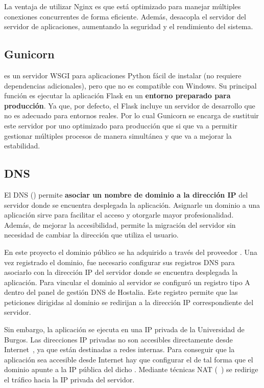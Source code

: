 La ventaja de utilizar Nginx es que está optimizado para manejar múltiples conexiones concurrentes de forma eficiente. Además, desacopla el servidor  del servidor de aplicaciones, aumentando la seguridad y el rendimiento del sistema.

\subsection{Gunicorn}\label{gunicorn}
 es un servidor WSGI para aplicaciones Python fácil de instalar (no requiere dependencias adicionales), pero que no es compatible con Windows. Su principal función es ejecutar la aplicación Flask en un \textbf{entorno preparado para producción}. Ya que, por defecto, el  Flask incluye un servidor de desarrollo que no es adecuado para entornos reales. Por lo cual Gunicorn se encarga de sustituir este servidor por uno optimizado para producción que si que va a permitir gestionar múltiples procesos de manera simultánea y que va a mejorar la estabilidad. 

\subsection{DNS}\label{dns}
El DNS () permite \textbf{asociar un nombre de dominio a la dirección IP} del servidor donde se encuentra desplegada la aplicación. Asignarle un dominio a una aplicación sirve para facilitar el acceso y otorgarle mayor profesionalidad. Además, de mejorar la accesibilidad, permite la migración del servidor sin necesidad de cambiar la dirección que utiliza el usuario.

En este proyecto el dominio público se ha adquirido a través del proveedor . Una vez registrado el dominio, fue necesario configurar sus registros DNS para asociarlo con la dirección IP del servidor donde se encuentra desplegada la aplicación. Para vincular el dominio al servidor se configuró un registro tipo A dentro del panel de gestión DNS de Hostalia. Este registro permite que las peticiones dirigidas al dominio se redirijan a la dirección IP correspondiente del servidor.

Sin embargo, la aplicación se ejecuta en una IP privada de la Universidad de Burgos. Las direcciones IP privadas no son accesibles directamente desde Internet~\cite{ herramienta:ip_privadaVSpublica}, ya que están destinadas a redes internas. Para conseguir que la aplicación sea accesible desde Internet hay que configurar el  de tal forma que el dominio apunte a la IP pública del dicho . Mediante técnicas NAT (~\cite{herramienta:nat}) se redirige el tráfico hacia la IP privada del servidor. 

